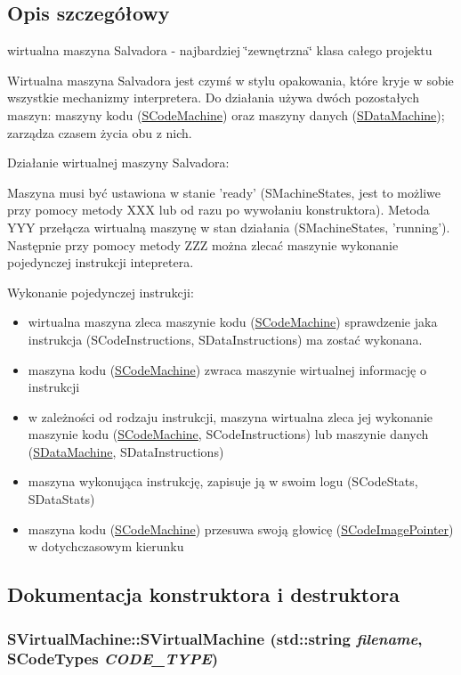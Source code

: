 \subsection{Opis szczegółowy}
wirtualna maszyna Salvadora - najbardziej \char`\"{}zewnętrzna\char`\"{} klasa całego projektu 

Wirtualna maszyna Salvadora jest czymś w stylu opakowania, które kryje w sobie wszystkie mechanizmy interpretera. Do działania używa dwóch pozostałych maszyn: maszyny kodu (\hyperlink{classSCodeMachine}{SCodeMachine}) oraz maszyny danych (\hyperlink{classSDataMachine}{SDataMachine}); zarządza czasem życia obu z nich.

Działanie wirtualnej maszyny Salvadora:

Maszyna musi być ustawiona w stanie 'ready' (SMachineStates, jest to możliwe przy pomocy metody XXX lub od razu po wywołaniu konstruktora). Metoda YYY przełącza wirtualną maszynę w stan działania (SMachineStates, 'running'). Następnie przy pomocy metody ZZZ można zlecać maszynie wykonanie pojedynczej instrukcji intepretera.

Wykonanie pojedynczej instrukcji:

\begin{itemize}
\item wirtualna maszyna zleca maszynie kodu (\hyperlink{classSCodeMachine}{SCodeMachine}) sprawdzenie jaka instrukcja (SCodeInstructions, SDataInstructions) ma zostać wykonana.\item maszyna kodu (\hyperlink{classSCodeMachine}{SCodeMachine}) zwraca maszynie wirtualnej informację o instrukcji\item w zależności od rodzaju instrukcji, maszyna wirtualna zleca jej wykonanie maszynie kodu (\hyperlink{classSCodeMachine}{SCodeMachine}, SCodeInstructions) lub maszynie danych (\hyperlink{classSDataMachine}{SDataMachine}, SDataInstructions)\item maszyna wykonująca instrukcję, zapisuje ją w swoim logu (SCodeStats, SDataStats)\item maszyna kodu (\hyperlink{classSCodeMachine}{SCodeMachine}) przesuwa swoją głowicę (\hyperlink{classSCodeImagePointer}{SCodeImagePointer}) w dotychczasowym kierunku \end{itemize}


\subsection{Dokumentacja konstruktora i destruktora}
\hypertarget{classSVirtualMachine_020a4e9202a688dffed1e0d8951f9164}{
\subsubsection[{SVirtualMachine}]{\setlength{\rightskip}{0pt plus 5cm}SVirtualMachine::SVirtualMachine (std::string {\em filename}, \/  {\bf SCodeTypes} {\em CODE\_\-TYPE})}}
\label{classSVirtualMachine_020a4e9202a688dffed1e0d8951f9164}


